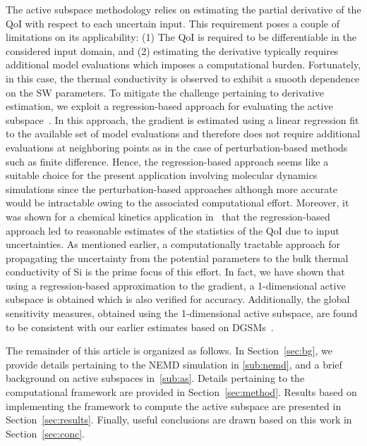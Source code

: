 The active subspace methodology relies on estimating the partial derivative of the QoI 
with respect to each uncertain input. This requirement poses a couple of limitations on its
applicability: (1) The QoI is required to be differentiable in the considered input domain, and (2)
estimating the derivative typically requires additional model evaluations which
imposes a computational burden. Fortunately, in this case,
the thermal conductivity is observed to exhibit a smooth dependence on the SW parameters. 
To mitigate the challenge pertaining to derivative estimation, we exploit 
a regression-based approach for evaluating the active subspace~\cite{Vohra:2018c}. 
In this approach, the gradient is estimated
using a linear regression fit to the available set of model evaluations and therefore does not 
require additional evaluations at neighboring points as in the case of perturbation-based
methods such as finite difference. Hence, the regression-based approach seems like a suitable 
choice for the present application involving molecular dynamics simulations since the
perturbation-based approaches although more accurate would be intractable owing to the
associated computational effort. Moreover, it was shown for a chemical kinetics application
in~\cite{Vohra:2018c} that the regression-based approach led to reasonable estimates of
 the statistics of the QoI due to input uncertainties.
As mentioned earlier, a computationally tractable approach for propagating the uncertainty
from the potential parameters to the bulk thermal conductivity of Si is the prime focus of this  
effort. In fact, we have
shown that using a regression-based approximation to the gradient, a 1-dimensional
active subspace is obtained which is also verified for accuracy. Additionally, the global 
sensitivity measures, obtained using the 1-dimensional active subspace, are found to be consistent with 
our earlier estimates based on DGSMs~\cite{Vohra:2018b}. 

The remainder of this article is organized as follows. In Section~\ref{sec:bg}, we provide details
pertaining to the NEMD simulation in \ref{sub:nemd}, and a brief background on active subspaces
in~\ref{sub:as}. 
Details pertaining to the computational framework are
provided in Section~\ref{sec:method}. Results based on implementing the framework to
compute the active subspace
are presented in Section~\ref{sec:results}. Finally, useful conclusions are drawn based on this
work in Section~\ref{sec:conc}.
































